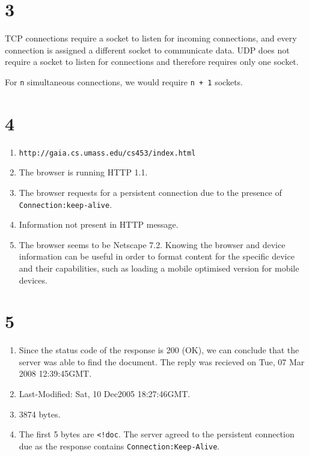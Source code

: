 \documentclass[12pt,letterpaper]{article}
\begin{document}
\section*{3}
TCP connections require a socket to listen for incoming connections, and every connection is assigned a different socket to communicate data. UDP does not require a socket to listen for connections and therefore requires only one socket.

For \texttt{n} simultaneous connections, we would require \texttt{n + 1} sockets.

\section*{4}
\begin{enumerate}[label=\alph*.]
    \item \texttt{http://gaia.cs.umass.edu/cs453/index.html}
    \item The browser is running HTTP 1.1.
    \item The browser requests for a persistent connection due to the presence of\\
            \texttt{Connection:keep-alive}.
    \item Information not present in HTTP message.
    \item The browser seems to be Netscape 7.2. Knowing the browser and device information can be useful in         order to format content for the specific device and their capabilities, such as loading a mobile         optimised version for mobile devices.\cite{UAS}
\end{enumerate}

\section*{5}
\begin{enumerate}[label=\alph*.]
    \item Since the status code of the response is 200 (OK), we can conclude that the server was able to find the document.
    The reply was recieved on Tue, 07 Mar 2008 12:39:45GMT.
    \item Last-Modified: Sat, 10 Dec2005 18:27:46GMT.
    \item 3874 bytes.
    \item The first 5 bytes are \texttt{<!doc}. The server agreed to the persistent connection due as the response contains \texttt{Connection:Keep-Alive}.
\end{enumerate}
\end{document}
